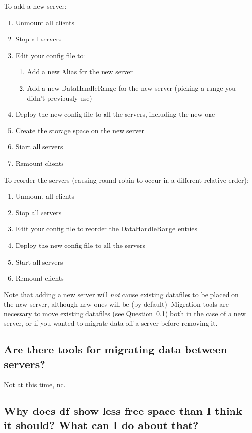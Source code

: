 \documentclass[11pt,letterpaper]{article}
\begin{document}
To add a new server:
\begin{enumerate}
\item Unmount all clients
\item Stop all servers
\item Edit your config file to:
  \begin{enumerate}
  \item Add a new Alias for the new server
  \item Add a new DataHandleRange for the new server (picking a range you
        didn't previously use)
  \end{enumerate}
\item Deploy the new config file to all the servers, including the new one
\item Create the storage space on the new server
\item Start all servers
\item Remount clients
\end{enumerate}

To reorder the servers (causing round-robin to occur in a different relative
order):
\begin{enumerate}
\item Unmount all clients
\item Stop all servers
\item Edit your config file to reorder the DataHandleRange entries
\item Deploy the new config file to all the servers
\item Start all servers
\item Remount clients
\end{enumerate}

Note that adding a new server will \emph{not} cause existing datafiles to be
placed on the new server, although new ones will be (by default).  Migration
tools are necessary to move existing datafiles (see
Question~\ref{sec:migration}) both in the case of a new server, or if you
wanted to migrate data off a server before removing it.

\subsection{Are there tools for migrating data between servers?}
\label{sec:migration}

Not at this time, no.

\subsection{Why does df show less free space than I think it should? What
            can I do about that?}
\end{document}
